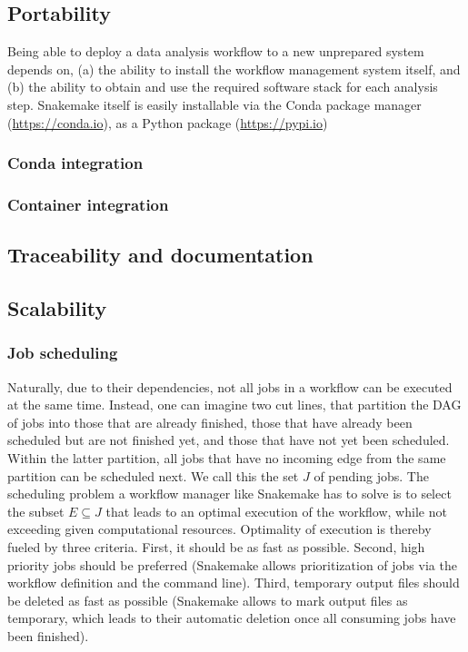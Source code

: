 \documentclass[parskip=half]{scrartcl}
\let\plainurl\url
\renewcommand{\url}[1]{\protect\plainurl{#1}}
\begin{document}
\subsection{Portability}

Being able to deploy a data analysis workflow to a new unprepared system depends on, (a) the ability to install the workflow management system itself, and (b) the ability to obtain and use the required software stack for each analysis step.
Snakemake itself is easily installable via the Conda package manager (\url{https://conda.io}), as a Python package (\url{https://pypi.io}) 

\subsubsection{Conda integration} 

\subsubsection{Container integration} 

\subsection{Traceability and documentation} 

\subsection{Scalability} 

\subsubsection{Job scheduling} 

Naturally, due to their dependencies, not all jobs in a workflow can be executed at the same time.
Instead, one can imagine two cut lines, that partition the DAG of jobs into those that are already finished, those that have already been scheduled but are not finished yet, and those that have not yet been scheduled.
Within the latter partition, all jobs that have no incoming edge from the same partition can be scheduled next.
We call this the set $J$ of pending jobs.
The scheduling problem a workflow manager like Snakemake has to solve is to select the subset $E \subseteq J$ that leads to an optimal execution of the workflow, while not exceeding given computational resources.
Optimality of execution is thereby fueled by three criteria.
First, it should be as fast as possible.
Second, high priority jobs should be preferred (Snakemake allows prioritization of jobs via the workflow definition and the command line).
Third, temporary output files should be deleted as fast as possible (Snakemake allows to mark output files as temporary, which leads to their automatic deletion once all consuming jobs have been finished).
\end{document}
